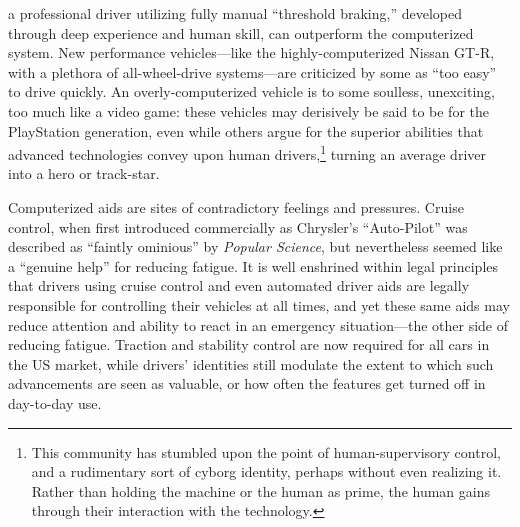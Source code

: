 a professional driver utilizing fully manual ``threshold braking,''
developed through deep experience and human skill, can outperform the
computerized system\cite{???}. New performance vehicles---like the
highly-computerized Nissan GT-R, with a plethora of all-wheel-drive
systems---are criticized by some as ``too easy'' to drive quickly\cite{???}.
An overly-computerized vehicle is to some soulless, unexciting, too much like
a video game: these vehicles may derisively be said to be for the
PlayStation generation, even while others argue for the superior
abilities that advanced technologies convey upon human
drivers,\footnote{This community has stumbled upon the point of
  human-supervisory control, and a rudimentary sort of cyborg
  identity, perhaps without even realizing it. Rather than holding the
machine or the human as prime, the human gains through their
interaction with the technology.}
turning an average driver into a hero or track-star\cite{???}.

Computerized aids are sites of contradictory feelings and pressures.
Cruise control, when first introduced commercially as Chrysler's ``Auto-Pilot''
was described as ``faintly
ominious'' by \emph{Popular Science}, but nevertheless seemed like a
``genuine help'' for reducing
fatigue\cite{???http://www.brookings.edu/research/papers/2014/04/products-liability-driverless-cars-villasenor}.
It is well enshrined within legal principles that drivers using
cruise control and even automated driver aids are legally responsible
for controlling their vehicles at all times, and yet these same aids
may reduce attention and ability to react in an emergency
situation---the other side of reducing fatigue.
Traction and stability control are now required for all cars in the US
market,\cite{???-brookings} while drivers' identities still modulate the
extent to which such
advancements are seen as valuable, or how often the features get
turned off in day-to-day use. 

